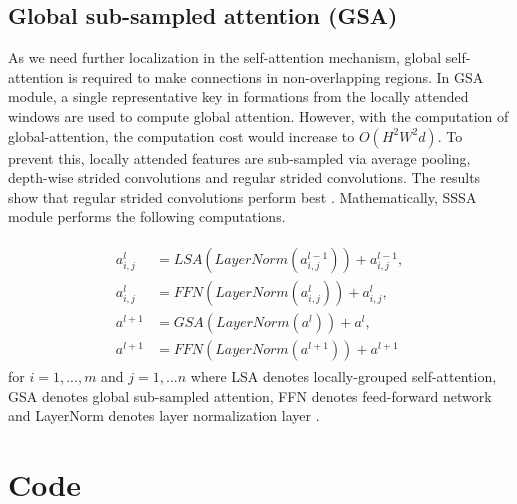 \documentclass[10pt, twocolumn, letterpaper]{article}
\begin{document}
\subsection{Global sub-sampled attention (GSA)}
As we need further localization in the self-attention mechanism, global self-attention is required to make connections in non-overlapping regions. In GSA module, a single representative key in formations from the locally attended windows are used to compute global attention. However, with the computation of global-attention, the computation cost would increase to $ O(H^2W^2d)$. To prevent this, locally attended features are sub-sampled via average pooling, depth-wise strided convolutions and regular strided convolutions. The results show that regular strided convolutions perform best \cite{chu2021twins}. Mathematically, SSSA module performs the following computations.

\begin{align}
\label{eqn:eqlabel}
\begin{aligned}
     a_{i,j}^l &= LSA(LayerNorm(a_{i,j}^{l-1})) + a_{i,j}^{l-1},
    \\
     a_{i,j}^l &= FFN(LayerNorm(a_{i,j}^{l})) + a_{i,j}^{l},
    \\
     a^{l+1} &= GSA(LayerNorm(a^{l})) + a^{l},
    \\
    a^{l+1} &= FFN(LayerNorm(a^{l + 1})) + a^{l+1} 
\end{aligned}
\end{align}
for $i = 1,...,m$ and $j = 1,...n$ where LSA denotes locally-grouped self-attention, GSA denotes global sub-sampled attention, FFN denotes feed-forward network and LayerNorm denotes layer normalization layer \cite{ba2016layer}. %

\clearpage
\onecolumn
\section{Code}
\label{appendix:F}
\end{document}

